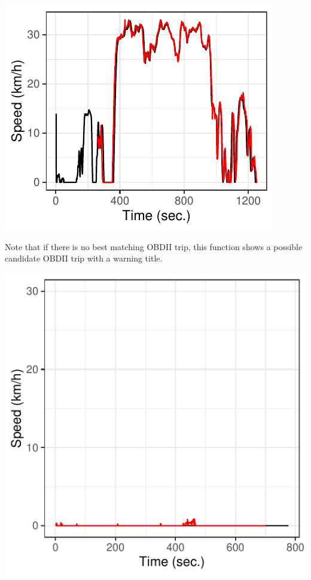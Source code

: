 \documentclass[letterpaper,9pt,twocolumn,twoside,]{pinp}
\begin{document}
\begin{center}\includegraphics{report_issaclee_files/figure-latex/sampleresult-1} \end{center}

Note that if there is no best matching OBDII trip, this function shows a
possible candidate OBDII trip with a warning title.

\begin{Shaded}
\begin{Highlighting}[]
\StringTok{ }\NormalTok{mobile_data[[}\NormalTok{]]}

\StringTok{ }

\end{Highlighting}
\end{Shaded}

\begin{center}\includegraphics{report_issaclee_files/figure-latex/unnamed-chunk-9-1} \end{center}





\end{document}
